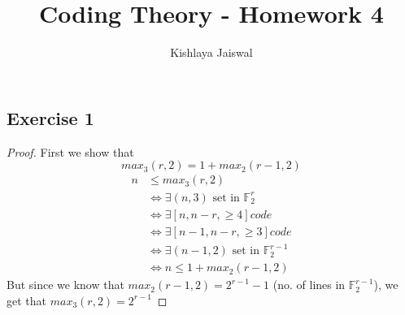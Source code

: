 \documentclass[12pt]{article}
\title{Coding Theory - Homework 4}
\author{Kishlaya Jaiswal}
\begin{document}
\maketitle

\vspace{0.5in}


\subsection*{Exercise 1}
\begin{proof}
First we show that 
$$max_3(r,2) = 1 + max_2(r-1,2)$$
\begin{align*}
    n &\leq max_3(r,2) \\
    &\Longleftrightarrow \exists (n,3) \text{ set in } \mathbb{F}_2^r \\
    &\Longleftrightarrow \exists [n, n-r, \geq 4] code \\
    &\Longleftrightarrow \exists [n-1, n-r, \geq 3] code \\
    &\Longleftrightarrow \exists (n-1,2) \text{ set in } \mathbb{F}_2^{r-1} \\
    &\Longleftrightarrow n \leq 1 + max_2(r-1,2)
\end{align*}
But since we know that $max_2(r-1,2) = 2^{r-1} - 1$ (no. of lines in $\mathbb{F}_2^{r-1}$), we get that $max_3(r,2) = 2^{r-1}$
\end{proof}
\end{document}
